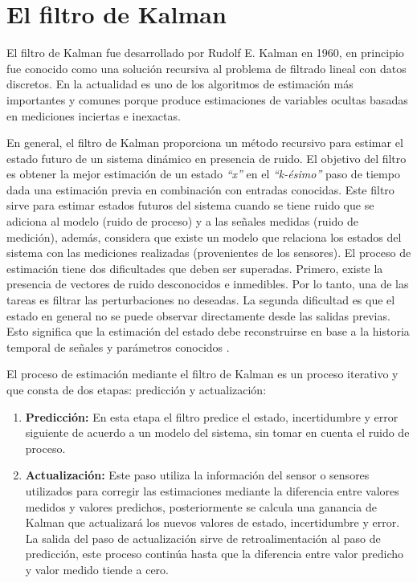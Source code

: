 \section{El filtro de Kalman} \label{sec:el_filtro_de_Kalman}

El filtro de Kalman fue desarrollado por Rudolf E. Kalman en 1960, en principio fue conocido como una solución recursiva al problema de filtrado lineal con datos discretos. En la actualidad es uno de los algoritmos de estimación más importantes y comunes porque produce estimaciones de variables ocultas basadas en mediciones inciertas e inexactas. 

En general, el filtro de Kalman proporciona un método recursivo para estimar el estado futuro de un sistema dinámico en presencia de ruido. El objetivo del filtro es obtener la mejor estimación de un estado \textit{``x''} en el \textit{``k-ésimo''} paso de tiempo dada una estimación previa en combinación con entradas conocidas. Este filtro sirve para estimar estados futuros del sistema cuando se tiene ruido que se adiciona al modelo (ruido de proceso) y a las señales medidas (ruido de medición), además, considera que existe un modelo que relaciona los estados del sistema con las mediciones realizadas (provenientes de los sensores). El proceso de estimación tiene dos dificultades que deben ser superadas. Primero, existe la presencia de vectores de ruido desconocidos e inmedibles. Por lo tanto, una de las tareas es filtrar las perturbaciones no deseadas. La segunda dificultad es que el estado en general no se puede observar directamente desde las salidas previas. Esto significa que la estimación del estado debe reconstruirse en base a la historia temporal de señales y parámetros conocidos \cite{choset2005principles}.

El proceso de estimación mediante el filtro de Kalman es un proceso iterativo y que consta de dos etapas: predicción y actualización: 
\begin{enumerate}
    \item \textbf{Predicción:} En esta etapa el filtro predice el estado, incertidumbre y error siguiente de acuerdo a un modelo del sistema, sin tomar en cuenta el ruido de proceso.
    \item \textbf{Actualización:} Este paso utiliza la información del sensor o sensores utilizados para corregir las estimaciones mediante la diferencia entre valores medidos y valores predichos, posteriormente se calcula una ganancia de Kalman que actualizará los nuevos valores de estado, incertidumbre y error.
    La salida del paso de actualización sirve de retroalimentación al paso de predicción, este proceso continúa hasta que la diferencia entre valor predicho y valor medido tiende a cero.
\end{enumerate}

